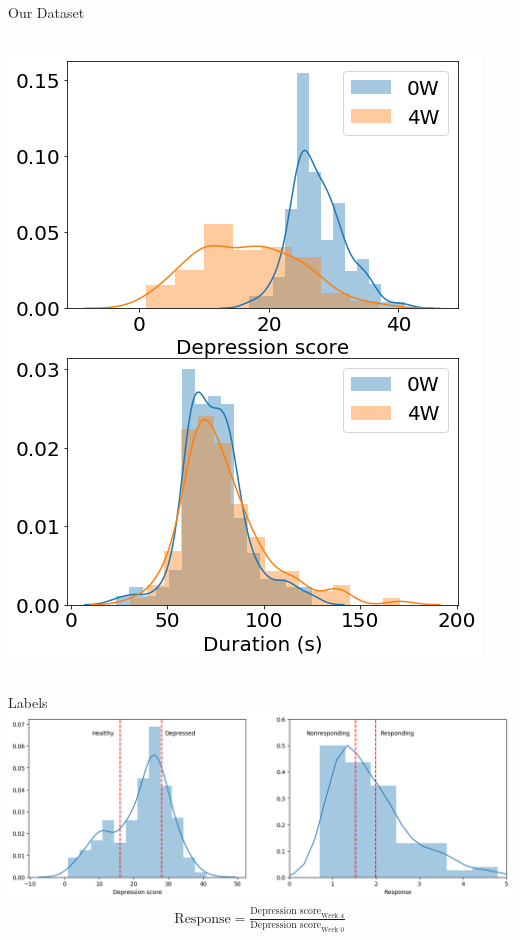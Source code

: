 \documentclass{beamer}
\begin{document}
\begin{frame}{Our Dataset}
\begin{columns}
			\includegraphics[width=\linewidth]{./Images/depscores_2.png}
	\end{columns}

\end{frame}


\begin{frame}{Labels}
  \centering
    \includegraphics[width=\linewidth]{./Images/labels.png}
    \\
    \begin{align*}
      \text{Response} = \frac{\text{Depression score}_{\text{Week 4}}}{\text{Depression score}_{\text{Week 0}}}
    \end{align*}
\end{frame}
\end{document}
